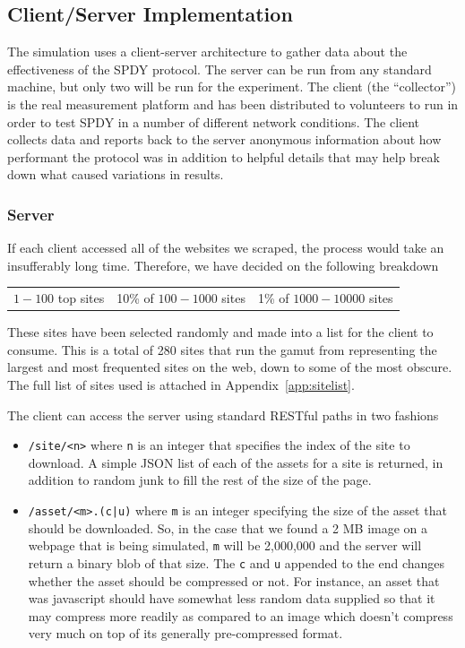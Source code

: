 \documentclass[10pt,letterpaper,notitlepage]{article}
\begin{document}
\subsection{Client/Server Implementation}
\label{sec:research/client-server}
The simulation uses a client-server architecture to gather data about the
effectiveness of the SPDY protocol. The server can be run from any standard
machine, but only two will be run for the experiment.  The client (the
``collector'') is the real measurement platform and has been distributed to
volunteers to run in order to test SPDY in a number of different network
conditions.  The client collects data and reports back to the server
anonymous information about how performant the protocol was in addition to
helpful details that may help break down what caused variations in results.
\subsubsection{Server}
\label{sec:research/server}
If each client accessed all of the websites we scraped, the process would take
an insufferably long time.  Therefore, we have decided on the following
breakdown
\begin{center}
\begin{tabular}{ccc}
$1-100$ top sites & 10\% of $100-1000$ sites & 1\% of $1000-10000$ sites \\
\end{tabular}
\end{center}

These sites have been selected randomly and made into a list for the client to
consume. This is a total of 280 sites that run the gamut from representing the
largest and most frequented sites on the web, down to some of the most obscure.
The full list of sites used is attached in Appendix~\ref{app:sitelist}.

The client can access the server using standard RESTful paths in two fashions
\begin{itemize}
\item \texttt{/site/<n>} where \texttt{n} is an integer that specifies the index
of the site to download. A simple JSON list of each of the assets for a site is
returned, in addition to random junk to fill the rest of the size of the page.

\item \texttt{/asset/<m>.(c|u)} where \texttt{m} is an integer specifying the size of the
asset that should be downloaded. So, in the case that we found a 2 MB image on a
webpage that is being simulated, \texttt{m} will be 2,000,000 and the server
will return a binary blob of that size. The \texttt{c} and \texttt{u} appended
to the end changes whether the asset should be compressed or not.  For instance, an asset
that was javascript should have somewhat less random data supplied so that it
may compress more readily as compared to an image which doesn't compress very
much on top of its generally pre-compressed format.
\end{itemize}
\end{document}
